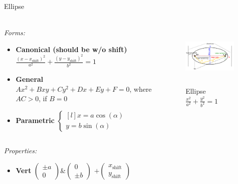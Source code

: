 \documentclass[aspectratio=169]{beamer}
\newcommand{\shf}{\text{shift}}
\begin{document}
    \begin{frame}[t]{Ellipse}
        \framesubtitle{}
            \scriptsize
            \vspace{-0.4cm}
        \begin{columns}[T,onlytextwidth]
            \begin{column}{0.59\textwidth}
                \textit{Forms:} \\
                \begin{itemize}
                    \item \textbf{Canonical (should be w/o shift)} $\frac{(x-x_{\shf})^2}{a^2}+\frac{(y-y_{\shf})^2}{b^2}=1$
                    \item \textbf{General} $Ax^2+Bxy+Cy^2+Dx+Ey+F=0$, where $AC > 0$, if $B=0$
                    \item \textbf{Parametric} $\left\{\begin{matrix*}[l] x = a\cos(\alpha)\\ y = b\sin(\alpha) \end{matrix*}\right.$
                \end{itemize}
            \end{column}
            \begin{column}{0.39\textwidth}
                \vspace{-0.5cm}
                \begin{figure}[H]
                    \centering\includegraphics[height=3cm,width=1\textwidth,keepaspectratio]{Ellipse.png}
                    \vspace{-0.5cm}
                    \caption*{\scriptsize Ellipse $\frac{x^2}{a^2}+\frac{y^2}{b^2}=1$}
                    \label{fig:Ellipse.png}
                \end{figure}
            \end{column}
        \end{columns}
        \vspace{-0.5cm}
        \textit{Properties:}
        \vspace{-0.2cm}
        \begin{multicols}{3}
            \begin{itemize}
                \item \textbf{Vert} $\begin{pmatrix} \pm a\\0 \end{pmatrix}$\&$\begin{pmatrix} 0\\\pm b \end{pmatrix}$ $ + \begin{pmatrix} x_{\shf}\\y_{\shf} \end{pmatrix}$

\end{itemize}
\end{multicols}
\end{frame}
\end{document}
